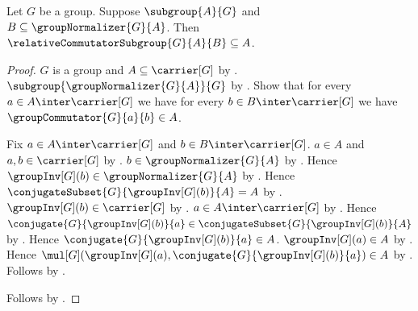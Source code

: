\begin{theorem}\label{relative_commutator_subgroup_le_of_subset_normalizer}
    Let $G$ be a group.
    Suppose $\subgroup{A}{G}$ and
        $B\subseteq\groupNormalizer{G}{A}$.
    Then $\relativeCommutatorSubgroup{G}{A}{B}\subseteq A$.
\end{theorem}
\begin{proof}
    $G$ is a group and $A\subseteq\carrier[G]$ by
        .
    $\subgroup{\groupNormalizer{G}{A}}{G}$ by
        .
    Show that for every $a\in A\inter\carrier[G]$ we have for every
        $b\in B\inter\carrier[G]$ we have
        $\groupCommutator{G}{a}{b}\in A$.
    \begin{subproof}
        Fix $a\in A\inter\carrier[G]$ and
            $b\in B\inter\carrier[G]$.
        $a\in A$ and $a,b\in\carrier[G]$ by
            .
        $b\in\groupNormalizer{G}{A}$ by
            .
        Hence $\groupInv[G](b)\in\groupNormalizer{G}{A}$ by
            .
        Hence
            $\conjugateSubset{G}{\groupInv[G](b)}{A}=A$ by
            .
        $\groupInv[G](b)\in\carrier[G]$ by
            .
        $a\in A\inter\carrier[G]$ by .
        Hence
            $\conjugate{G}{\groupInv[G](b)}{a}\in
                \conjugateSubset{G}{\groupInv[G](b)}{A}$ by
            .
        Hence $\conjugate{G}{\groupInv[G](b)}{a}\in A$.
        $\groupInv[G](a)\in A$ by .
        Hence
            $\mul[G](\groupInv[G](a),
                \conjugate{G}{\groupInv[G](b)}{a})\in A$ by
            .
        Follows by .
    \end{subproof}
    Follows by .
\end{proof}

